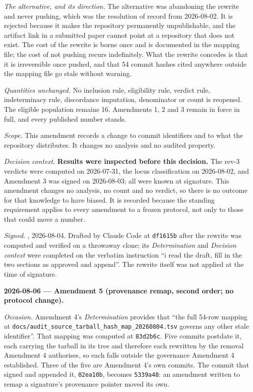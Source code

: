 \emph{The alternative, and its direction.} The alternative was abandoning the rewrite and never pushing, which was the resolution of record from 2026-08-02. It is rejected because it makes the repository permanently unpublishable, and the artifact link in a submitted paper cannot point at a repository that does not exist. The cost of the rewrite is borne once and is documented in the mapping file; the cost of not pushing recurs indefinitely. What the rewrite concedes is that it is irreversible once pushed, and that 54 commit hashes cited anywhere outside the mapping file go stale without warning.

\emph{Quantities unchanged.} No inclusion rule, eligibility rule, verdict rule, indeterminacy rule, discordance imputation, denominator or count is reopened. The eligible population remains 16. Amendments 1, 2 and 3 remain in force in full, and every published number stands.

\emph{Scope.} This amendment records a change to commit identifiers and to what the repository distributes. It changes no analysis and no audited property.

\emph{Decision context.} \textbf{Results were inspected before this decision.} The rev-3 verdicts were computed on 2026-07-31, the locus classification on 2026-08-02, and Amendment 3 was signed on 2026-08-03; all were known at signature. This amendment changes no analysis, no count and no verdict, so there is no outcome for that knowledge to have biased. It is recorded because the standing requirement applies to every amendment to a frozen protocol, not only to those that could move a number.

\emph{Signed.} \authorname{}, 2026-08-04. Drafted by Claude Code at \texttt{df1615b} after the rewrite was computed and verified on a throwaway clone; its \emph{Determination} and \emph{Decision context} were completed on the verbatim instruction ``i read the draft, fill in the two sections as approved and append''. The rewrite itself was not applied at the time of signature.

\textbf{2026-08-06 --- Amendment 5 (provenance remap, second order; no protocol change).}

\emph{Occasion.} Amendment 4's \emph{Determination} provides that ``the full 54-row mapping at \texttt{docs/\allowbreak{}audit\_source\_tarball\_hash\_map\_20260804.tsv} governs any other stale identifier''. That mapping was computed at \texttt{83d2b6c}. Five commits postdate it, each carrying the tarball in its tree and therefore each rewritten by the removal Amendment 4 authorises, so each falls outside the governance Amendment 4 established. Three of the five are Amendment 4's own commits. The commit that signed and appended it, \texttt{02ea10b}, becomes \texttt{5339a48}: an amendment written to remap a signature's provenance pointer moved its own.


